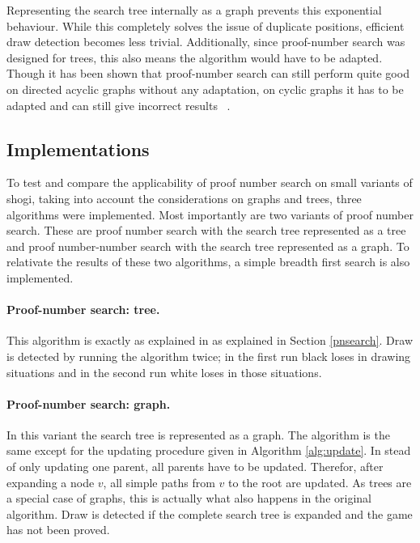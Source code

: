\documentclass{article}
\begin{document}
Representing the search tree internally as a graph prevents this exponential behaviour. While this completely solves the issue of duplicate
positions, efficient draw detection becomes less trivial. Additionally, since proof-number search was designed for trees, this also means
the algorithm would have to be adapted.
Though it has been shown that proof-number search can still perform quite good on directed acyclic graphs without any adaptation,
on cyclic graphs it has to be adapted and can still give incorrect results ~\cite{Schijf93}.\\

\subsection{Implementations}
To test and compare the applicability of proof number search on small variants of shogi, taking into account the considerations on graphs and trees,
three algorithms were implemented. Most importantly are two variants of proof number search. These are proof number search with the search tree
represented as a tree and proof number-number search with the search tree represented as a graph.
To relativate the results of these two algorithms, a simple breadth first search is also implemented.

\paragraph{Proof-number search: tree.} This algorithm is exactly as explained in  as explained in Section \ref{pnsearch}. Draw is detected by running
the algorithm twice; in the first run black loses in drawing situations and in the second run white loses in those situations.

\paragraph{Proof-number search: graph.} In this variant the search tree is represented as a graph. The algorithm is the same except for the updating
procedure given in Algorithm \ref{alg:update}. In stead of only updating one parent, all parents have to be updated. Therefor, after expanding a
node $v$, all simple paths from $v$ to the root are updated. As trees are a special case of graphs, this is actually what also happens in the original
algorithm. Draw is detected if the complete search tree is expanded and the game has not been proved.
\end{document}
